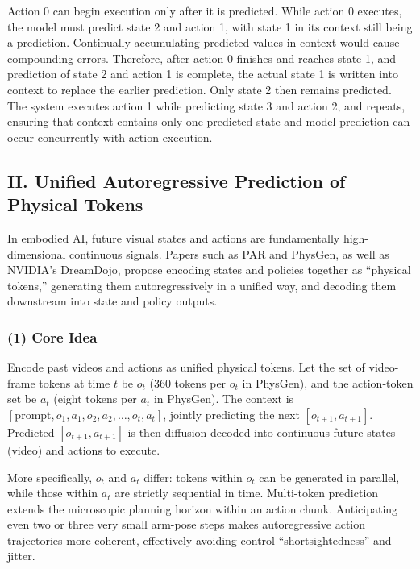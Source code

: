 Action 0 can begin execution only after it is predicted. While action 0 executes, the model must predict state 2 and action 1, with state 1 in its context still being a prediction. Continually accumulating predicted values in context would cause compounding errors. Therefore, after action 0 finishes and reaches state 1, and prediction of state 2 and action 1 is complete, the actual state 1 is written into context to replace the earlier prediction. Only state 2 then remains predicted. The system executes action 1 while predicting state 3 and action 2, and repeats, ensuring that context contains only one predicted state and model prediction can occur concurrently with action execution.

\hypertarget{ii.-unified-autoregressive-prediction-of-physical-tokens}{%
\subsection{II. Unified Autoregressive Prediction of Physical Tokens}\label{ii.-unified-autoregressive-prediction-of-physical-tokens}}

In embodied AI, future visual states and actions are fundamentally high-dimensional continuous signals. Papers such as PAR and PhysGen, as well as NVIDIA's DreamDojo, propose encoding states and policies together as ``physical tokens,'' generating them autoregressively in a unified way, and decoding them downstream into state and policy outputs.

\hypertarget{core-idea-7}{%
\subsubsection{(1) Core Idea}\label{core-idea-7}}

Encode past videos and actions as unified physical tokens. Let the set of video-frame tokens at time \(t\) be \(o_t\) (360 tokens per \(o_t\) in PhysGen), and the action-token set be \(a_t\) (eight tokens per \(a_t\) in PhysGen). The context is \([\mathrm{prompt},o_1,a_1,o_2,a_2,\ldots,o_t,a_t]\), jointly predicting the next \([o_{t+1},a_{t+1}]\). Predicted \([o_{t+1},a_{t+1}]\) is then diffusion-decoded into continuous future states (video) and actions to execute.

More specifically, \(o_t\) and \(a_t\) differ: tokens within \(o_t\) can be generated in parallel, while those within \(a_t\) are strictly sequential in time. Multi-token prediction extends the microscopic planning horizon within an action chunk. Anticipating even two or three very small arm-pose steps makes autoregressive action trajectories more coherent, effectively avoiding control ``shortsightedness'' and jitter.

